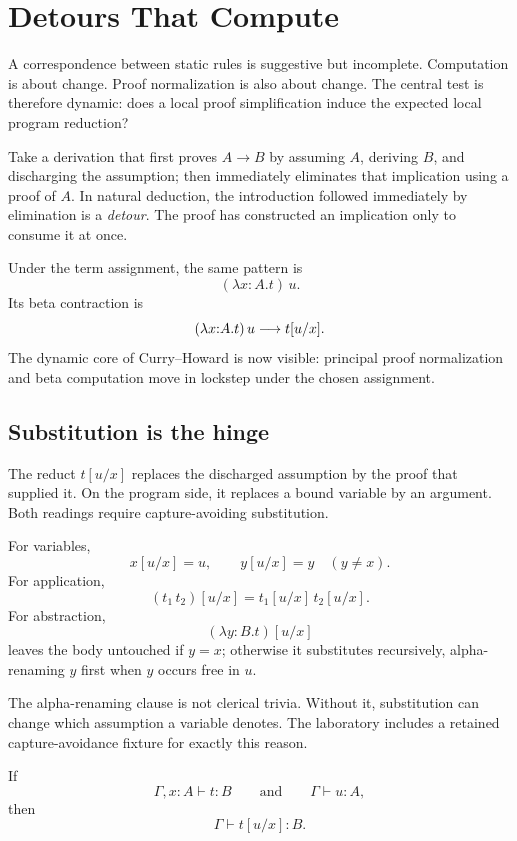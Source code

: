 \chapter{Detours That Compute}
\label{ch:detours-compute}

A correspondence between static rules is suggestive but incomplete. Computation is about change. Proof normalization is also about change. The central test is therefore dynamic: does a local proof simplification induce the expected local program reduction?

Take a derivation that first proves $A\to B$ by assuming $A$, deriving $B$, and discharging the assumption; then immediately eliminates that implication using a proof of $A$. In natural deduction, the introduction followed immediately by elimination is a \emph{detour}. The proof has constructed an implication only to consume it at once.

Under the term assignment, the same pattern is
\[
 (\lambda x{:}A.t)\,u.
\]
Its beta contraction is
\[
 (\lambda x{:}A.t)\,u\mathrel{\longrightarrow} t[u/x].
\]
The dynamic core of Curry--Howard is now visible: principal proof normalization and beta computation move in lockstep under the chosen assignment.



\section{Substitution is the hinge}

The reduct $t[u/x]$ replaces the discharged assumption by the proof that supplied it. On the program side, it replaces a bound variable by an argument. Both readings require capture-avoiding substitution.

\begin{formal}[title={Formal Interlude: capture-avoiding substitution}]
For variables,
\[
 x[u/x]=u,\qquad y[u/x]=y\quad(y\neq x).
\]
For application,
\[
 (t_1\,t_2)[u/x]=t_1[u/x]\,t_2[u/x].
\]
For abstraction,
\[
 (\lambda y{:}B.t)[u/x]
\]
leaves the body untouched if $y=x$; otherwise it substitutes recursively, alpha-renaming $y$ first when $y$ occurs free in $u$.
\end{formal}

The alpha-renaming clause is not clerical trivia. Without it, substitution can change which assumption a variable denotes. The laboratory includes a retained capture-avoidance fixture for exactly this reason.

\begin{lemma}
\label{lem:substitution-imp}
If
\[
 \Gamma,x{:}A\vdash t:B
 \qquad\text{and}\qquad
 \Gamma\vdash u:A,
\]
then
\[
 \Gamma\vdash t[u/x]:B.
\]
\end{lemma}

